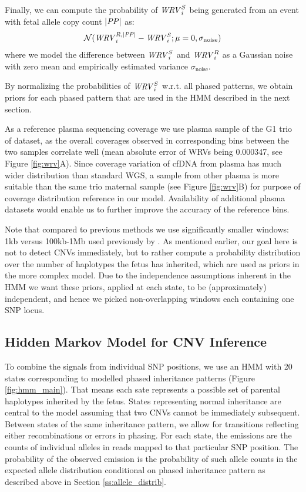 Finally, we can compute the probability of $\mathit{WRV}_i^S$ being generated from an event with fetal allele copy count $|\mathit{PP}|$ as:
\begin{align}
\mathcal{N}(\mathit{WRV}_i^{R,|\mathit{PP}|}-\mathit{WRV}_i^S; \mu=0, \sigma_{\text{noise}})
\label{eq:wrv_distrib}
\end{align}
where we model the difference between $\mathit{WRV}_i^S$ and $\mathit{WRV}_i^R$ as a Gaussian noise with zero mean and empirically estimated variance $\sigma_{\text{noise}}$.

By normalizing the probabilities of $\mathit{WRV}_i^S$ w.r.t. all phased patterns, we obtain priors for each phased pattern that are used in the HMM described in the next section. 

As a reference plasma sequencing coverage we use plasma sample of the G1 trio of \cite{kitzman2012} dataset, as the overall coverages observed in corresponding bins between the two samples correlate well (mean absolute error of WRVs being 0.000347, see Figure \ref{fig:wrv}A). Since coverage variation of cfDNA from plasma has much wider distribution than standard WGS, a sample from other plasma is more suitable than the same trio maternal sample (see Figure \ref{fig:wrv}B) for purpose of coverage distribution reference in our model. Availability of additional plasma datasets would enable us to further improve the accuracy of the reference bins.

Note that compared to previous methods we use significantly smaller windows: \ntilde1kb versus 100kb-1Mb used previously by \cite{chen2013, srinivasan2013}. As mentioned earlier, our goal here is not to detect CNVs immediately, but to rather compute a probability distribution over the number of haplotypes the fetus has inherited, which are used as  priors in the more complex model. Due to the independence assumptions inherent in the HMM we want these priors, applied at each state, to be (approximately) independent, and hence we picked non-overlapping windows each containing one SNP locus.

\subsection{Hidden Markov Model for CNV Inference}\label{ss:hmm}
To combine the signals from individual SNP positions, we use an HMM with 20 states corresponding to modelled phased inheritance patterns (Figure \ref{fig:hmm_main}). That means each sate represents a possible set of parental haplotypes inherited by the fetus. States representing normal inheritance are central to the model assuming that two CNVs cannot be immediately subsequent. Between states of the same inheritance pattern, we allow for transitions reflecting either recombinations or errors in phasing. For each state, the emissions are the counts of individual alleles in reads mapped to that particular SNP position. The probability of the observed emission is the probability of such allele counts in the expected allele distribution conditional on phased inheritance pattern as described above in Section \ref{ss:allele_distrib}.

